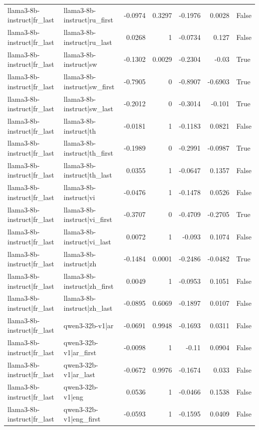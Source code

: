 \begin{table}
\begin{tabular}{l l r r r r l}
llama3-8b-instruct|fr_last & llama3-8b-instruct|ru_first & -0.0974 & 0.3297 & -0.1976 & 0.0028 & False \\
llama3-8b-instruct|fr_last & llama3-8b-instruct|ru_last & 0.0268 & 1 & -0.0734 & 0.127 & False \\
llama3-8b-instruct|fr_last & llama3-8b-instruct|sw & -0.1302 & 0.0029 & -0.2304 & -0.03 & True \\
llama3-8b-instruct|fr_last & llama3-8b-instruct|sw_first & -0.7905 & 0 & -0.8907 & -0.6903 & True \\
llama3-8b-instruct|fr_last & llama3-8b-instruct|sw_last & -0.2012 & 0 & -0.3014 & -0.101 & True \\
llama3-8b-instruct|fr_last & llama3-8b-instruct|th & -0.0181 & 1 & -0.1183 & 0.0821 & False \\
llama3-8b-instruct|fr_last & llama3-8b-instruct|th_first & -0.1989 & 0 & -0.2991 & -0.0987 & True \\
llama3-8b-instruct|fr_last & llama3-8b-instruct|th_last & 0.0355 & 1 & -0.0647 & 0.1357 & False \\
llama3-8b-instruct|fr_last & llama3-8b-instruct|vi & -0.0476 & 1 & -0.1478 & 0.0526 & False \\
llama3-8b-instruct|fr_last & llama3-8b-instruct|vi_first & -0.3707 & 0 & -0.4709 & -0.2705 & True \\
llama3-8b-instruct|fr_last & llama3-8b-instruct|vi_last & 0.0072 & 1 & -0.093 & 0.1074 & False \\
llama3-8b-instruct|fr_last & llama3-8b-instruct|zh & -0.1484 & 0.0001 & -0.2486 & -0.0482 & True \\
llama3-8b-instruct|fr_last & llama3-8b-instruct|zh_first & 0.0049 & 1 & -0.0953 & 0.1051 & False \\
llama3-8b-instruct|fr_last & llama3-8b-instruct|zh_last & -0.0895 & 0.6069 & -0.1897 & 0.0107 & False \\
llama3-8b-instruct|fr_last & qwen3-32b-v1|ar & -0.0691 & 0.9948 & -0.1693 & 0.0311 & False \\
llama3-8b-instruct|fr_last & qwen3-32b-v1|ar_first & -0.0098 & 1 & -0.11 & 0.0904 & False \\
llama3-8b-instruct|fr_last & qwen3-32b-v1|ar_last & -0.0672 & 0.9976 & -0.1674 & 0.033 & False \\
llama3-8b-instruct|fr_last & qwen3-32b-v1|eng & 0.0536 & 1 & -0.0466 & 0.1538 & False \\
llama3-8b-instruct|fr_last & qwen3-32b-v1|eng_first & -0.0593 & 1 & -0.1595 & 0.0409 & False \\

\end{tabular}
\end{table}

